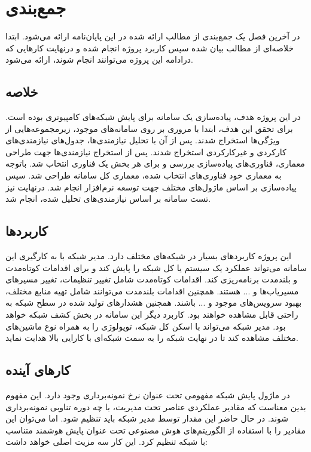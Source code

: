 \chapter{جمع‌بندی}
در آخرین فصل یک جمع‌بندی از مطالب ارائه شده در این پایان‌نامه ارائه می‌شود. ابتدا خلاصه‌ای از مطالب بیان شده سپس کاربرد پروژه انجام شده و درنهایت کارهایی که درادامه این پروژه می‌توانند انجام شوند، ارائه می‌شود.

\section{خلاصه}

در این پروژه هدف، پیاده‌سازی یک سامانه برای پایش شبکه‌های کامپیوتری بوده است. برای تحقق این هدف، ابتدا با مروری بر روی سامانه‌های موجود، زیرمجموعه‌هایی از ویژگی‌ها استخراج شدند. پس از آن با تحلیل نیازمندی‌ها، جدول‌های نیازمندی‌های کارکردی و غیرکارکردی استخراج شدند. پس از استخراج نیازمندی‌ها جهت طراحی معماری، فناوری‌های پیاده‌سازی بررسی و برای هر بخش یک فناوری انتخاب شد. باتوجه به معماری خود فناوری‌های انتخاب شده، معماری کل سامانه طراحی شد. سپس پیاده‌سازی بر اساس ماژول‌های مختلف جهت توسعه نرم‌افزار انجام شد. درنهایت نیز تست سامانه بر اساس نیازمندی‌های تحلیل شده، انجام شد.


\section{کاربرد‌ها}

این پروژه کاربرد‌های بسیار در شبکه‌های مختلف دارد. مدیر شبکه با به کارگیری این سامانه می‌تواند عملکرد یک سیستم یا کل شبکه را پایش کند و برای اقدامات کوتاه‌مدت و بلندمدت برنامه‌ریزی کند. اقدامات کوتاه‌مدت شامل تغییر تنظیمات، تغییر مسیرهای مسیریاب‌ها و ... هستند. همچنین اقدامات بلندمدت می‌توانند شامل تهیه منابع مختلف، بهبود سرویس‌های موجود و ... باشند. همچنین هشدارهای تولید شده در سطح شبکه به راحتی قابل مشاهده خواهند بود. کاربرد دیگر این سامانه در بخش کشف شبکه خواهد بود. مدیر شبکه می‌تواند با اسکن کل شبکه، توپولوژی را به همراه نوع ماشین‌های مختلف مشاهده کند تا در نهایت شبکه را به سمت شبکه‌ای با کارایی بالا هدایت نماید.

\newpage

\section{کار‌های آینده}

در ماژول پایش شبکه مفهومی تحت عنوان نرخ نمونه‌برداری وجود دارد. این مفهوم بدین معناست که مقادیر عملکردی عناصر تحت مدیریت، با چه دوره تناوبی نمونه‌برداری شوند. در حال حاضر این مقدار توسط مدیر شبکه باید تنظیم شود. اما می‌توان این مقادیر را با استفاده از الگوریتم‌های هوش مصنوعی تحت عنوان پایش هوشمند متناسب با شبکه تنظیم کرد. این کار سه مزیت اصلی خواهد داشت:

